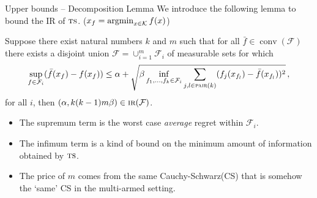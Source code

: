 \documentclass{beamer}
\newcommand{\pair}{\operatorname{\textsc{pair}}}
\newcommand{\conv}{\operatorname{conv}}
\newcommand{\argmin}{\operatornamewithlimits{argmin}}
\newcommand{\cK}{\mathcal{K}}
\newcommand{\cF}{\mathcal{F}}
\newcommand{\ts}{{\textsc{ts}}}
\newcommand{\IR}{\operatorname{\textsc{ir}}}
\begin{document}
\begin{frame}{Upper bounds -- Decomposition Lemma}
    \small
    We introduce the following lemma to bound the IR of $\ts$. ($x_f = \argmin_{x\in \cK} f(x)$)
    \begin{tcolorbox}[title=Proposition 5 -- $\ts$-IR Decomposition,colback=blue!5!white,colframe=blue!50!black]
        Suppose there exist natural numbers $k$ and $m$ such that for all $\bar f \in \conv(\cF)$ there exists a disjoint union $\cF = \cup_{i=1}^m \cF_i$ of measurable sets
        for which
        \begin{align*}
            \sup_{f \in \cF_i} (\bar f(x_f) - f(x_f)) \leq \alpha + \sqrt{\beta \inf_{f_1,\ldots,f_k \in \cF_i} \sum_{j,l \in \pair(k)} (f_j(x_{f_l}) - \bar f(x_{f_l}))^2} \,,
        \end{align*}
        for all $i$, then $(\alpha, k(k-1)m\beta) \in \IR(\cF)$.
    \end{tcolorbox}
    \begin{itemize}
        \item<1-> The supremum term is the worst case \emph{average} regret within $\cF_i$.
        \item<2-> The infimum term is a kind of bound on the minimum amount of information obtained by $\ts$.
        \item<3-> The price of $m$ comes from the same Cauchy-Schwarz(CS) that is somehow the `same' CS in the multi-armed setting.
    \end{itemize}
\end{frame}

\end{document}
